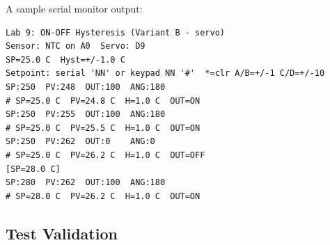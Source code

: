 \documentclass[12pt]{article}
\begin{document}
A sample serial monitor output:

\begin{lstlisting}
Lab 9: ON-OFF Hysteresis (Variant B - servo)
Sensor: NTC on A0  Servo: D9
SP=25.0 C  Hyst=+/-1.0 C
Setpoint: serial 'NN' or keypad NN '#'  *=clr A/B=+/-1 C/D=+/-10
SP:250  PV:248  OUT:100  ANG:180
# SP=25.0 C  PV=24.8 C  H=1.0 C  OUT=ON
SP:250  PV:255  OUT:100  ANG:180
# SP=25.0 C  PV=25.5 C  H=1.0 C  OUT=ON
SP:250  PV:262  OUT:0    ANG:0
# SP=25.0 C  PV=26.2 C  H=1.0 C  OUT=OFF
[SP=28.0 C]
SP:280  PV:262  OUT:100  ANG:180
# SP=28.0 C  PV=26.2 C  H=1.0 C  OUT=ON
\end{lstlisting}

\subsection{Test Validation}
\end{document}
